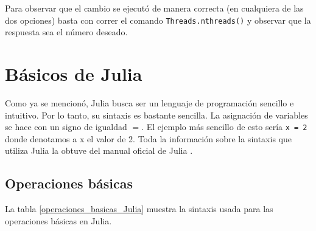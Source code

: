 Para observar que el cambio se ejecutó de manera correcta (en cualquiera de las dos opciones) basta con correr el comando \texttt{Threads.nthreads()} y observar que la respuesta sea el número deseado. 

\section{Básicos de Julia}
Como ya se mencionó, Julia busca ser un lenguaje de programación sencillo e intuitivo. Por lo tanto, su sintaxis es bastante sencilla. La asignación de variables se hace con un signo de igualdad $=$. El ejemplo más sencillo de esto sería \texttt{x = 2} donde denotamos a x el valor de 2. Toda la información sobre la sintaxis que utiliza Julia la obtuve del manual oficial de Julia \citep{manual_Julia}.

\subsection{Operaciones básicas}
La tabla \ref{operaciones_basicas_Julia} muestra la sintaxis usada para las operaciones básicas en Julia. 


